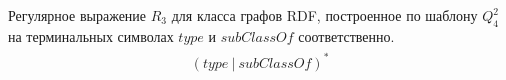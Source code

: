 



\begin{ruexample}
    Регулярное выражение $R_3$ для класса графов RDF, построенное по шаблону $Q_{4}^{2}$ на терминальных символах $type$ и $subClassOf$ соответственно.
\begin{align}
\begin{split}
\label{reg:rdf_reg_3}
(type ~|~ subClassOf)^*
\end{split}
\end{align}
\end{ruexample}

